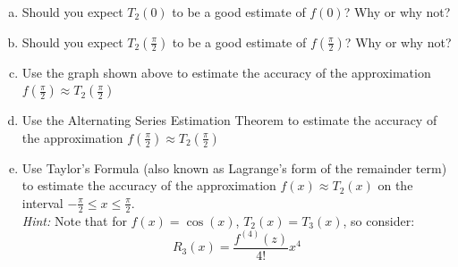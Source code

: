 \begin{list}{\bf{Example : }}{}
\begin{center}
\end{center}


\begin{enumerate}[a)]


	\item Should you expect \(T_2(0)\) to be a good estimate of \(f(0)\)? Why or why not? 
	
\vspace*{.75in}	
	
	\item Should you expect \(T_2(\tfrac{\pi}{2})\) to be a good estimate of \(f(\tfrac{\pi}{2})\)? Why or why not? 
	
\vspace*{.75in}		

\item Use the graph shown above to estimate the accuracy of the approximation \(f(\tfrac{\pi}{2})\approx T_2(\tfrac{\pi}{2})\)
	
\vspace*{.75in}		
	
	\item Use the Alternating Series Estimation Theorem to estimate the accuracy of the approximation \(f(\tfrac{\pi}{2})\approx T_2(\tfrac{\pi}{2})\)


\vspace*{.75in}	

\item Use Taylor's Formula (also known as Lagrange's form of the remainder term) to estimate the accuracy of the approximation \(f(x)\approx T_2(x)\) on the interval \(-\tfrac{\pi}{2} \leq x \leq \tfrac{\pi}{2}\).\\
  \textit{Hint:} Note that for \(f(x) = \cos(x)\),  \(T_2(x) = T_3(x)\), so consider:
\[
R_3(x) = \frac{f^{(4)}(z)}{4!}x^4
\]

\vspace*{.75in}

\end{enumerate}





\end{list}



